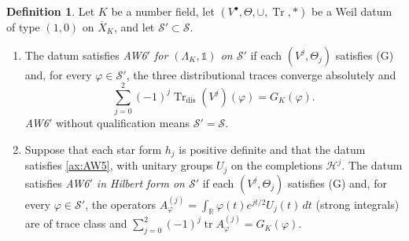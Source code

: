 \documentclass[11pt]{amsart}
\theoremstyle{plain}
\theoremstyle{definition}
\newtheorem{definition}[theorem]{Definition}
\theoremstyle{remark}
\numberwithin{equation}{section}
\newcommand{\R}{\mathbb{R}}
\newcommand{\Xbar}{\overline{X}}
\newcommand{\cH}{\mathscr{H}}
\DeclareMathOperator{\Tr}{Tr}
\DeclareMathOperator{\tr}{tr}
\begin{document}
\begin{definition}\label{def:aw6prime}
Let $K$ be a number field, let $(V^\bullet,\Theta,\cup,\Tr,*)$ be a
Weil datum of type $(1,0)$ on $\Xbar_K$, and let
$\mathcal S'\subset\mathcal S$.
\begin{enumerate}[label=(\alph*)]
\item The datum satisfies \emph{AW6$'$ for $(\Lambda_K,\mathbb 1)$ on
  $\mathcal S'$} if each $(V^j,\Theta_j)$ satisfies (G) and, for every
  $\varphi\in\mathcal S'$, the three distributional traces converge
  absolutely and
  \begin{equation}\label{eq:aw6prime}
  \sum_{j=0}^2(-1)^j\Tr_{\mathrm{dis}}(V^j)(\varphi)=G_K(\varphi).
  \tag{AW6$'$}
  \end{equation}
  \emph{AW6$'$} without qualification means $\mathcal S'=\mathcal S$.
\item Suppose that each star form $h_j$ is positive definite and that
  the datum satisfies \ref{ax:AW5}, with unitary groups $U_j$ on the
  completions $\cH^j$. The datum satisfies \emph{AW6$'$ in Hilbert form
  on $\mathcal S'$} if each $(V^j,\Theta_j)$ satisfies (G) and, for
  every $\varphi\in\mathcal S'$, the operators
  $A^{(j)}_\varphi=\int_\R\varphi(t)e^{jt/2}U_j(t)\,dt$ (strong
  integrals) are of trace class and
  $\sum_{j=0}^2(-1)^j\tr A^{(j)}_\varphi=G_K(\varphi)$.
\end{enumerate}
\end{definition}
\end{document}
